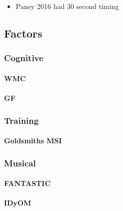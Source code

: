 \documentclass[]{book}
\providecommand{\tightlist}{%
  \setlength{\itemsep}{0pt}\setlength{\parskip}{0pt}}
\let\oldparagraph\paragraph
\renewcommand{\paragraph}[1]{\oldparagraph{#1}\mbox{}}
\begin{document}
\begin{itemize}
\tightlist
\item
  Paney 2016 had 30 second timing
\end{itemize}

\hypertarget{factors}{%
\subsection{Factors}\label{factors}}

\hypertarget{cognitive-1}{%
\subsubsection{Cognitive}\label{cognitive-1}}

\hypertarget{wmc}{%
\paragraph{WMC}\label{wmc}}

\hypertarget{gf}{%
\paragraph{GF}\label{gf}}

\hypertarget{training}{%
\subsubsection{Training}\label{training}}

\hypertarget{goldsmiths-msi}{%
\paragraph{Goldsmiths MSI}\label{goldsmiths-msi}}

\hypertarget{musical}{%
\subsubsection{Musical}\label{musical}}

\hypertarget{fantastic}{%
\paragraph{FANTASTIC}\label{fantastic}}

\hypertarget{idyom}{%
\paragraph{IDyOM}\label{idyom}}
\end{document}
